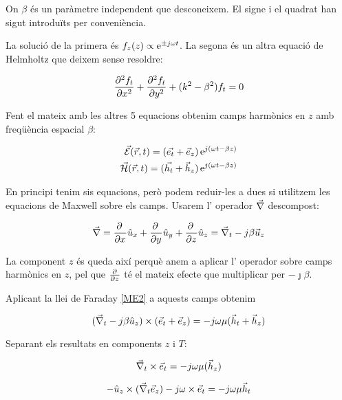 On $\beta$ és un paràmetre independent que desconeixem. El signe i el quadrat han sigut introduïts per conveniència.

La solució de la primera és $f_z(z) \propto \e{ \pm \jmath \omega t}$. La segona és un altra equació de Helmholtz que deixem sense resoldre:

\begin{equation}
  \pd[2]{f_t}{x} + \pd[2]{f_t}{y}  + (k^2 - \beta ^2) f_t = 0
\end{equation}

Fent el mateix amb les altres 5 equacions obtenim camps harmònics en $z$ amb freqüència espacial $\beta$:

\begin{align}
  \rfield E \rtfun = ( \vec{e_t} + \vec e_z ) \e{\jmath(\omega t - \beta z)}  \\
  \rfield H \rtfun = ( \vec{h_t} + \vec h_z ) \e{\jmath(\omega t - \beta z)}
\end{align}

En principi tenim sis equacions, però podem reduir-les a dues si utilitzem les equacions de Maxwell sobre els camps. Usarem l' operador $\del$ descompost:

\begin{equation}
  \del = \pd{\,}{x}\ux + \pd{\,}{y}\uy +\pd{\,}{z}\uz = \del _t - \jmath \beta \vec u_z
\end{equation}

La component $z$ és queda així perquè anem a aplicar l' operador sobre camps harmònics en $z$, pel que $\pd{}{z}$ té el mateix efecte que multiplicar per $-\jmath \beta$.

Aplicant la llei de Faraday \cref{ME2} a aquests camps obtenim

\begin{equation}
  (\del_t-\jmath\beta\uz)\times (\vec e_t +\vec e_z) = -\jmath\omega\mu (\vec h _t + \vec h_z) 
\end{equation}

Separant els resultats en components $z$ i $T$:

\begin{equation}
  \del _t \times \vec e_t = -\jmath \omega\mu(\vec h_z ) \label{eT}
\end{equation}

\begin{equation}
  -\uz \times (\del _t \vec e_z ) -\jmath \omega \times \vec e_t = -\jmath \omega \mu \vec h _t \label{eZ}
\end{equation}

